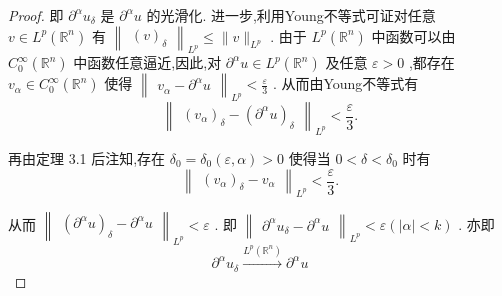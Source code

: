 \documentclass[lang=cn,newtx,10pt,scheme=chinese,thmcnt=chapter]{elegantbook}
\begin{document}
\begin{proof}
即 \({\partial }^{\alpha }{u}_{\delta }\) 是 \({\partial }^{\alpha }u\) 的光滑化. 进一步,利用Young不等式可证对任意 \(v \in  {L}^{p}\left( {\mathbb{R}}^{n}\right)\) 有 \({\begin{Vmatrix}{\left( v\right) }_{\delta }\end{Vmatrix}}_{{L}^{p}} \leqslant  \parallel v{\parallel }_{{L}^{p}}\) . 由于 \({L}^{p}\left( {\mathbb{R}}^{n}\right)\) 中函数可以由 \({C}_{0}^{\infty }\left( {\mathbb{R}}^{n}\right)\) 中函数任意逼近,因此,对 \({\partial }^{\alpha }u \in  {L}^{p}\left( {\mathbb{R}}^{n}\right)\) 及任意 \(\varepsilon  > 0\) ,都存在 \({v}_{\alpha } \in  {C}_{0}^{\infty }\left( {\mathbb{R}}^{n}\right)\) 使得 \({\begin{Vmatrix}{v}_{\alpha } - {\partial }^{\alpha }u\end{Vmatrix}}_{{L}^{p}} < \frac{\varepsilon }{3}\) . 从而由Young不等式有
\begin{equation*}
{\begin{Vmatrix}{\left( {v}_{\alpha }\right) }_{\delta } - {\left( {\partial }^{\alpha }u\right) }_{\delta }\end{Vmatrix}}_{{L}^{p}} < \frac{\varepsilon }{3}.
\end{equation*}

再由定理 3.1 后注知,存在 \({\delta }_{0} = {\delta }_{0}\left( {\varepsilon ,\alpha }\right)  > 0\) 使得当 \(0 < \delta  < {\delta }_{0}\) 时有
\begin{equation*}
{\begin{Vmatrix}{\left( {v}_{\alpha }\right) }_{\delta } - {v}_{\alpha }\end{Vmatrix}}_{{L}^{p}} < \frac{\varepsilon }{3}.
\end{equation*}

从而 \({\begin{Vmatrix}{\left( {\partial }^{\alpha }u\right) }_{\delta } - {\partial }^{\alpha }u\end{Vmatrix}}_{{L}^{p}} < \varepsilon\) . 即 \({\begin{Vmatrix}{\partial }^{\alpha }{u}_{\delta } - {\partial }^{\alpha }u\end{Vmatrix}}_{{L}^{p}} < \varepsilon \left( {\left| \alpha \right|  < k}\right)\) . 亦即
\begin{equation*}
{\partial }^{\alpha }{u}_{\delta }\overset{{L}^{p}\left( {\mathbb{R}}^{n}\right) }{ \longrightarrow  }{\partial }^{\alpha }u
\end{equation*}
\end{proof}
\end{document}
